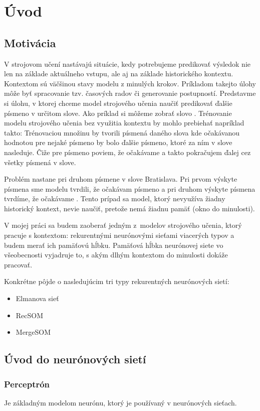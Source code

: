 \chapter{Úvod}

\section{Motivácia}
V strojovom učení nastávajú situácie, kedy potrebujeme predikovať výsledok nie len na 
základe aktuálneho vstupu, 
ale aj na základe historického kontextu. Kontextom sú väčšinou stavy modelu z minulých krokov.
Príkladom takejto úlohy môže byť spracovanie tzv. časových radov či generovanie postupností.
Predstavme si úlohu, v ktorej chceme model strojového učenia naučiť predikovať ďalšie písmeno v určitom slove. 
Ako príklad si môžeme zobrať slovo . 
Trénovanie modelu strojového učenia bez využitia kontextu by mohlo prebiehať napríklad takto:
Trénovaciou množinu by tvorili písmená daného slova kde očakávanou hodnotou pre nejaké písmeno by bolo ďalšie písmeno, ktoré za ním v slove nasleduje.
Čiže pre písmeno  poviem, že očakávame  a takto pokračujem ďalej cez všetky písmená v slove.

Problém nastane pri druhom písmene  v slove Bratislava. Pri prvom výskyte písmena  sme modelu tvrdili, že očakávam písmeno  a 
pri druhom výskyte písmena  tvrdíme, že očakávame . 
Tento prípad sa model, ktorý nevyužíva žiadny historický kontext, nevie naučiť, pretože nemá žiadnu pamäť (okno do minulosti).

V mojej práci sa budem zaoberať jedným z~modelov strojového učenia, ktorý pracuje s kontextom: rekurentnými neurónovými sieťami viacerých typov a budem merať ich 
pamäťovú hĺbku. Pamäťová hĺbka neurónovej siete vo všeobecnosti vyjadruje to, s akým dlhým kontextom do minulosti dokáže pracovať.

Konkrétne pôjde o nasledujúcim tri typy rekurentných neurónových sietí:
\begin{itemize}
	\item Elmanova sieť
	\item RecSOM
	\item MergeSOM
\end{itemize}

\section{Úvod do neurónových sietí}

\subsection{Perceptrón}
Je základným modelom neurónu, ktorý je používaný v neurónových sieťach.


